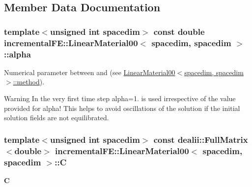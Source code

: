 \subsection{Member Data Documentation}
\subsubsection[{\texorpdfstring{alpha}{alpha}}]{\setlength{\rightskip}{0pt plus 5cm}template$<$unsigned int spacedim$>$ const double {\bf incremental\+F\+E\+::\+Linear\+Material00}$<$ spacedim, spacedim $>$\+::alpha\hspace{0.3cm}{\ttfamily [private]}}\hypertarget{classincremental_f_e_1_1_linear_material00_3_01spacedim_00_01spacedim_01_4_a12c7da528cdd260b6a09bd9e66213781}{}\label{classincremental_f_e_1_1_linear_material00_3_01spacedim_00_01spacedim_01_4_a12c7da528cdd260b6a09bd9e66213781}
Numerical parameter between {} and {} (see \hyperlink{classincremental_f_e_1_1_linear_material00_3_01spacedim_00_01spacedim_01_4_aa8c59701106680d7d5e474674f1a5b00}{Linear\+Material00$<$spacedim, spacedim$>$\+::method}).

\begin{DoxyWarning}{Warning}
In the very first time step {\ttfamily alpha=1.} is used irrespective of the value provided for {\ttfamily alpha!} This helps to avoid oscillations of the solution if the initial solution fields are not equilibrated. 
\end{DoxyWarning}
\subsubsection[{\texorpdfstring{C}{C}}]{\setlength{\rightskip}{0pt plus 5cm}template$<$unsigned int spacedim$>$ const dealii\+::\+Full\+Matrix$<$double$>$ {\bf incremental\+F\+E\+::\+Linear\+Material00}$<$ spacedim, spacedim $>$\+::C\hspace{0.3cm}{\ttfamily [private]}}\hypertarget{classincremental_f_e_1_1_linear_material00_3_01spacedim_00_01spacedim_01_4_a73536564b0df52fe76ec1c14b9dbe116}{}\label{classincremental_f_e_1_1_linear_material00_3_01spacedim_00_01spacedim_01_4_a73536564b0df52fe76ec1c14b9dbe116}
$\boldsymbol{C}$ 
